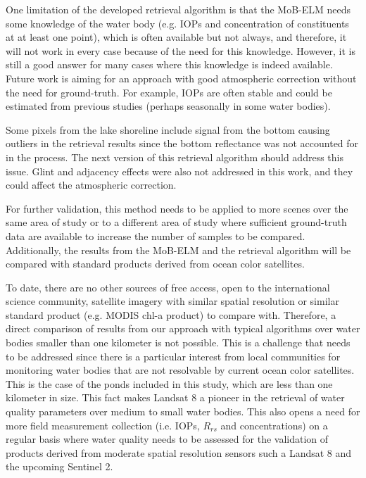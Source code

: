 \documentclass[onecolumn,3p,letterpaper]{elsarticle}
\begin{document}

One limitation of the developed retrieval algorithm is that the MoB-ELM needs some knowledge of the water body (e.g. IOPs and concentration of constituents at at least one point), which is often available but not always, and therefore, it will not work in every case because of the need for this knowledge. However, it is still a good answer for many cases where this knowledge is indeed available. Future work is aiming for an approach with good atmospheric correction without the need for ground-truth. For example, IOPs are often stable and could be estimated from previous studies (perhaps seasonally in some water bodies).

Some pixels from the lake shoreline include signal from the bottom causing outliers in the retrieval results since the bottom reflectance was not accounted for in the process. The next version of this retrieval algorithm should address this issue. Glint and adjacency effects were also not addressed in this work, and they could affect the atmospheric correction.

For further validation, this method needs to be applied to more scenes over the same area of study or to a different area of study where sufficient ground-truth data are available to increase the number of samples to be compared. Additionally, the results from the MoB-ELM and the retrieval algorithm will be compared with standard products derived from ocean color satellites.

To date, there are no other sources of free access, open to the international science community, satellite imagery with similar spatial resolution or similar standard product (e.g. MODIS chl-a product) to compare with. Therefore, a direct comparison of results from our approach with typical algorithms over water bodies smaller than one kilometer is not possible. This is a challenge that needs to be addressed since there is a particular interest from local communities for monitoring water bodies that are not resolvable by current ocean color satellites. This is the case of the ponds included in this study, which are less than one kilometer in size. This fact makes Landsat 8 a pioneer in the retrieval of water quality parameters over medium to small water bodies. This also opens a need for more field measurement collection (i.e. IOPs, $R_{rs}$ and concentrations) on a regular basis where water quality needs to be assessed for the validation of products derived from moderate spatial resolution sensors such a Landsat 8 and the upcoming Sentinel 2. 
\end{document}
